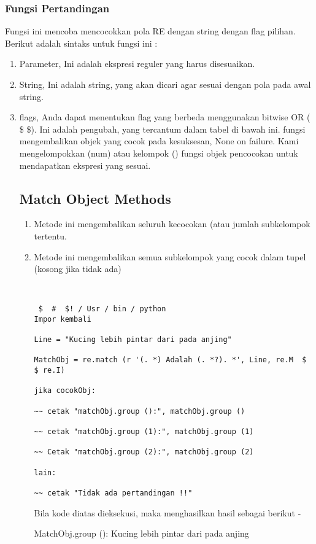 \subsubsection {Fungsi Pertandingan}
Fungsi ini mencoba mencocokkan pola RE dengan string dengan flag pilihan.
Berikut adalah sintaks untuk fungsi ini :
\begin {enumerate}
\item Parameter, Ini adalah ekspresi reguler yang harus disesuaikan.
\item String, Ini adalah string, yang akan dicari agar sesuai dengan pola pada awal string.
\item flags, Anda dapat menentukan flag yang berbeda menggunakan bitwise OR ( \$ \$). Ini adalah pengubah, yang tercantum dalam tabel di bawah ini. fungsi mengembalikan objek yang cocok pada kesuksesan, None on failure. Kami mengelompokkan (num) atau kelompok () fungsi objek pencocokan untuk mendapatkan ekspresi yang sesuai.

\subsection {Match Object Methods}
\begin {enumerate}
\item Metode ini mengembalikan seluruh kecocokan (atau jumlah subkelompok tertentu.
\item Metode ini mengembalikan semua subkelompok yang cocok dalam tupel (kosong jika tidak ada)

\begin{verbatim}


 $  #  $! / Usr / bin / python
Impor kembali

Line = "Kucing lebih pintar dari pada anjing"

MatchObj = re.match (r '(. *) Adalah (. *?). *', Line, re.M  $    $ re.I)

jika cocokObj:

~~ cetak "matchObj.group ():", matchObj.group ()

~~ cetak "matchObj.group (1):", matchObj.group (1)

~~ Cetak "matchObj.group (2):", matchObj.group (2)

lain:

~~ cetak "Tidak ada pertandingan !!"
\end{verbatim}

Bila kode diatas dieksekusi, maka menghasilkan hasil sebagai berikut -

MatchObj.group (): Kucing lebih pintar dari pada anjing


\end{enumerate}
\end{enumerate}
